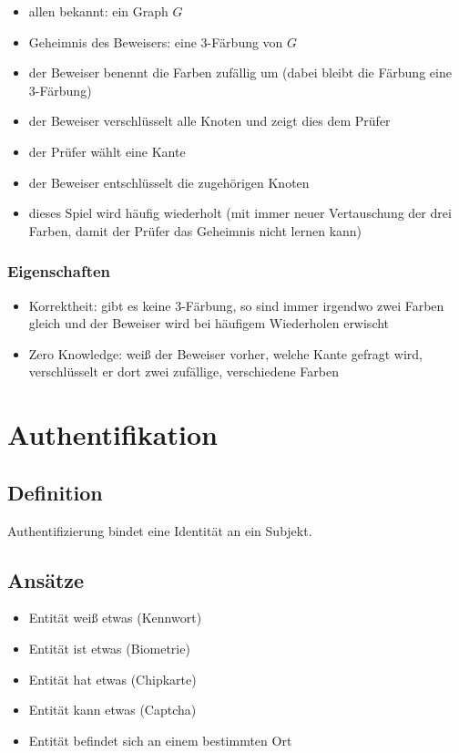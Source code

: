 \documentclass[a4paper,twoside,DIV15,BCOR12mm]{scrbook}
\begin{document}
\begin{itemize}
	\item allen bekannt: ein Graph $G$
	\item Geheimnis des Beweisers: eine 3-Färbung von $G$
	\item der Beweiser benennt die Farben zufällig um (dabei bleibt die Färbung eine 3-Färbung)
	\item der Beweiser verschlüsselt alle Knoten und zeigt dies dem Prüfer
	\item der Prüfer wählt eine Kante
	\item der Beweiser entschlüsselt die zugehörigen Knoten
	\item dieses Spiel wird häufig wiederholt (mit immer neuer Vertauschung der drei Farben, damit der Prüfer das Geheimnis nicht lernen kann)
\end{itemize}

\subsection{Eigenschaften}

\begin{itemize}
	\item Korrektheit: gibt es keine 3-Färbung, so sind immer irgendwo zwei Farben gleich und der Beweiser wird bei häufigem Wiederholen erwischt
	\item Zero Knowledge: weiß der Beweiser vorher, welche Kante gefragt wird, verschlüsselt er dort zwei zufällige, verschiedene Farben
\end{itemize}


\chapter{Authentifikation}

\section{Definition}

Authentifizierung bindet eine Identität an ein Subjekt.

\section{Ansätze}

\begin{itemize}
	\item Entität weiß etwas (Kennwort)
	\item Entität ist etwas (Biometrie)
	\item Entität hat etwas (Chipkarte)
	\item Entität kann etwas (Captcha)
	\item Entität befindet sich an einem bestimmten Ort
\end{itemize}
\end{document}
